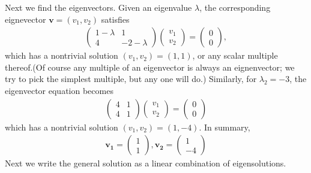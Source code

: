 Next we find the eigenvectors. Given an eigenvalue $\lambda$, the corresponding eignevector $\mathbf{v}=(v_1,v_2)$ satisfies
\begin{eqnarray}
	\begin{pmatrix}
		1-\lambda & 1
		\\
		4 & -2-\lambda
	\end{pmatrix}
	\begin{pmatrix}
		v_1
		\\
		v_2
	\end{pmatrix}
	=
	\begin{pmatrix}
		0
		\\
		0
	\end{pmatrix},
\end{eqnarray}
which has a nontrivial solution $(v_1,v_2)=(1,1)$, or any scalar multiple thereof.(Of course any multiple of an eigenvector is always an eignenvector; we try to pick the simplest multiple, but any one will do.) Similarly, for $\lambda_2=-3$, the eigenvector equation becomes
\begin{eqnarray*}
	\begin{pmatrix}
		4 & 1
		\\
		4 & 1
	\end{pmatrix}
	\begin{pmatrix}
		v_1
		\\
		v_2
	\end{pmatrix}
	=
	\begin{pmatrix}
		0
		\\
		0
	\end{pmatrix}
\end{eqnarray*}
which has a nontrivial solution $(v_1,v_2)=(1,-4)$. In summary, 
\begin{eqnarray*}
	\mathbf{v_1}=
	\begin{pmatrix}
		1
		\\
		1
	\end{pmatrix}, 
	\mathbf{v_2}=
	\begin{pmatrix}
		1
		\\
		-4
	\end{pmatrix}
\end{eqnarray*}
Next we write the general solution as a linear combination of eigensolutions.
\\

